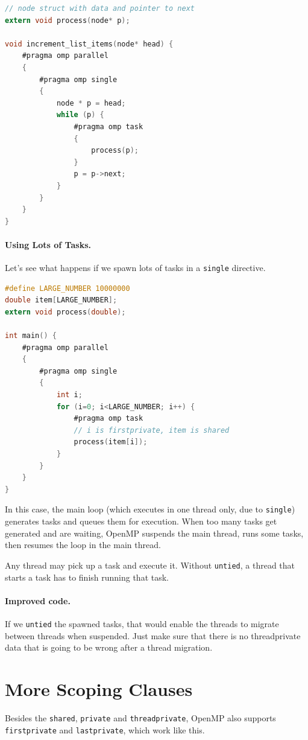 \documentclass[a4paper]{report}
\begin{document}
  \begin{lstlisting}[language=C]
// node struct with data and pointer to next
extern void process(node* p);

void increment_list_items(node* head) {
    #pragma omp parallel
    {
        #pragma omp single
        {
            node * p = head;
            while (p) {
                #pragma omp task
                {
                    process(p);
                }
                p = p->next;
            }
        }
    }
}
  \end{lstlisting}

\paragraph{Using Lots of Tasks.} Let's see what happens
if we spawn lots of tasks in a {\tt single} directive.

  \begin{lstlisting}[language=C]
#define LARGE_NUMBER 10000000
double item[LARGE_NUMBER];
extern void process(double);

int main() {
    #pragma omp parallel
    {
        #pragma omp single
        {
            int i;
            for (i=0; i<LARGE_NUMBER; i++) {
                #pragma omp task
                // i is firstprivate, item is shared
                process(item[i]);
            }
        }
    }
}
  \end{lstlisting}

In this case, the main loop (which executes in one thread only, due to {\tt single}) generates tasks and queues them for execution. When too many tasks get generated and are waiting, OpenMP suspends the main thread, runs some tasks, then resumes the loop in the main thread.

Any thread may pick up a task and execute it. Without {\tt untied}, a thread that starts a task has to finish running that task.

\paragraph{Improved code.} If we {\tt untied} the spawned tasks, that would enable the threads to
migrate between threads when suspended. Just make sure that there is no threadprivate data that
is going to be wrong after a thread migration.

\section*{More Scoping Clauses}
Besides the {\tt shared}, {\tt private} and {\tt threadprivate}, OpenMP also 
supports {\tt firstprivate} and {\tt lastprivate}, which work like this.
\end{document}
